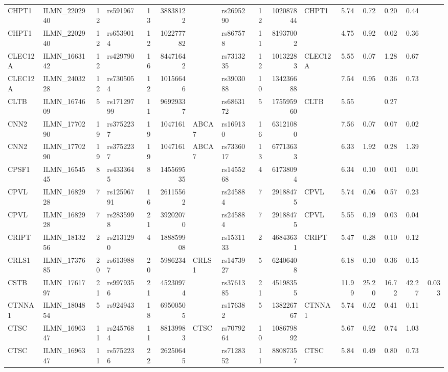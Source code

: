 \documentclass{article}
\begin{document}
\begin{landscape}
{\begin{ThreePartTable}
\begin{longtable}{|llr|lrrl|lrrl|rrrr|r|}
CHPT1 & ILMN\_2202940 & 12 & rs591967 & 13 & 38838122 &  & rs2695290 & 12 & 102087844 & CHPT1 & 5.74 & 0.72 & 0.20 & 0.44 &  \\
CHPT1 & ILMN\_2202940 & 12 & rs6539014 & 12 & 102277782 &  & rs867578 & 11 & 81937002 &  & 4.75 & 0.92 & 0.02 & 0.36 &  \\
CLEC12A & ILMN\_1663142 & 12 & rs429790 & 16 & 84471642 &  & rs7313235 & 12 & 10132283 & CLEC12A & 5.55 & 0.07 & 1.28 & 0.67 &  \\
CLEC12A & ILMN\_2403228 & 12 & rs7305054 & 12 & 10156646 &  & rs3903088 & 10 & 134236688 &  & 7.54 & 0.95 & 0.36 & 0.73 &  \\
CLTB & ILMN\_1674609 & 5 & rs17129799 & 11 & 96929337 &  & rs6863172 & 5 & 175595960 & CLTB & 5.55 &  & 0.27 &  &  \\
CNN2 & ILMN\_1770290 & 19 & rs3752237 & 19 & 1047161 & ABCA7 & rs169130 & 16 & 63121080 &  & 7.56 & 0.07 & 0.07 & 0.02 &  \\
CNN2 & ILMN\_1770290 & 19 & rs3752237 & 19 & 1047161 & ABCA7 & rs7336017 & 13 & 67713633 &  & 6.33 & 1.92 & 0.28 & 1.39 &  \\
CPSF1 & ILMN\_1654545 & 8 & rs4333645 & 8 & 145569535 &  & rs1455268 & 4 & 61738094 &  & 6.34 & 0.10 & 0.01 & 0.01 &  \\
CPVL & ILMN\_1682928 & 7 & rs12596791 & 16 & 26115562 &  & rs245884 & 7 & 29188475 & CPVL & 5.74 & 0.06 & 0.57 & 0.23 &  \\
CPVL & ILMN\_1682928 & 7 & rs2835998 & 21 & 39202070 &  & rs245884 & 7 & 29188475 & CPVL & 5.55 & 0.19 & 0.03 & 0.04 &  \\
CRIPT & ILMN\_1813256 & 2 & rs2131290 & 4 & 188859908 &  & rs1531133 & 2 & 46843631 & CRIPT & 5.47 & 0.28 & 0.10 & 0.12 &  \\
CRLS1 & ILMN\_1737685 & 20 & rs6139887 & 20 & 5986234 & CRLS1 & rs1473927 & 5 & 62406408 &  & 6.18 & 0.10 & 0.36 & 0.15 &  \\
CSTB & ILMN\_1761797 & 21 & rs9979356 & 21 & 45230974 &  & rs3761385 & 21 & 45198355 &  & 11.99 & 25.20 & 16.72 & 42.27 & 0.033 \\
CTNNA1 & ILMN\_1804854 & 5 & rs924943 & 18 & 69500505 &  & rs176382 & 5 & 138226767 & CTNNA1 & 5.74 & 0.02 & 0.41 & 0.11 &  \\
CTSC & ILMN\_1696347 & 11 & rs2457684 & 11 & 88139983 & CTSC & rs7079264 & 10 & 108679892 &  & 5.67 & 0.92 & 0.74 & 1.03 &  \\
CTSC & ILMN\_1696347 & 11 & rs5752236 & 22 & 26250645 &  & rs7128352 & 11 & 88087357 & CTSC & 5.84 & 0.49 & 0.80 & 0.73 &  \\

\end{longtable}
\end{ThreePartTable}}
\end{landscape}
\end{document}
